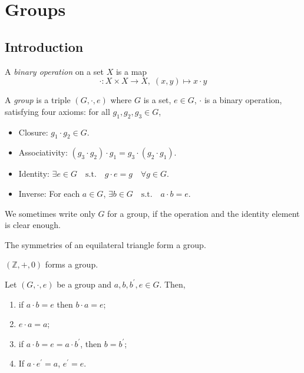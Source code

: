 \documentclass[10pt, a4paper, twoside]{report}
\begin{document}
\section{Groups}
\subsection{Introduction}
\begin{definition}
    A \emph{binary operation} on a set \(X\) is a map \[\cdot:X\times X\to X,\;(x,y)\mapsto x\cdot y\]
\end{definition}
\begin{definition}
    A \emph{group} is a triple \((G,\cdot,e)\) where \(G\) is a set, \(e\in G\), \(\cdot\) is a binary operation, satisfying four axioms: for all \(g_1,g_2,g_3\in G\), 
    \begin{itemize}
        \item Closure: \(g_1\cdot g_2\in G\).
        \item Associativity: \((g_3\cdot g_2)\cdot g_1=g_3\cdot (g_2\cdot g_1)\).
        \item Identity: \(\exists e\in G\quad\text{s.t.}\quad g\cdot e=g\quad\forall g\in G\).
        \item Inverse: For each \(a\in G\), \(\exists b\in G\quad\text{s.t.}\quad a\cdot b=e\).
      \end{itemize}
\end{definition}
We sometimes write only \(G\) for a group, if the operation and the identity element is clear enough.
\begin{example}
    The symmetries of an equilateral triangle form a group.
\end{example}
\begin{example}
    \((\mathbb{Z},+,0)\) forms a group.
\end{example}
\begin{proposition}
    Let \((G,\cdot,e)\) be a group and \(a,b,b^\prime,e\in G\). Then,
    \begin{enumerate}
        \item if \(a\cdot b=e\) then \(b\cdot a=e\);
        \item \(e\cdot a=a\);
        \item if \(a\cdot b=e=a\cdot b^\prime\), then \(b=b^\prime\);
        \item If \(a\cdot e^\prime=a\), \(e^\prime=e\).
    \end{enumerate}
    \label{prop:elem_group}
\end{proposition}
\end{document}
